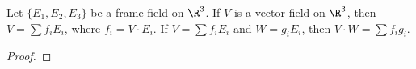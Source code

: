 \documentclass[10pt]{article}
\begin{document}
\begin{proposition}
    Let $\{{E}_{1},{E}_{2},{E}_{3}\}$ be a frame field on ${\R}^{3}$. If $V$ is a vector field on ${\R}^{3}$, then $V=\sum{f}_{i}{E}_{i}$, where ${f}_{i}=V\cdot{E}_{i}$. If $V=\sum{f}_{i}{E}_{i}$ and $W={g}_{i}{E}_{i}$, then $V\cdot W=\sum{f}_{i}{g}_{i}$.
\end{proposition}
\begin{proof}
    
\end{proof}

\hindex
\end{document}
